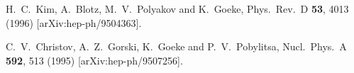 H.~C.~Kim, A.~Blotz, M.~V.~Polyakov and K.~Goeke,
Phys.\ Rev.\ D {\bf 53}, 4013 (1996)
[arXiv:hep-ph/9504363].




C.~V.~Christov, A.~Z.~Gorski, K.~Goeke and P.~V.~Pobylitsa,
Nucl.\ Phys.\ A {\bf 592}, 513 (1995)
[arXiv:hep-ph/9507256].

